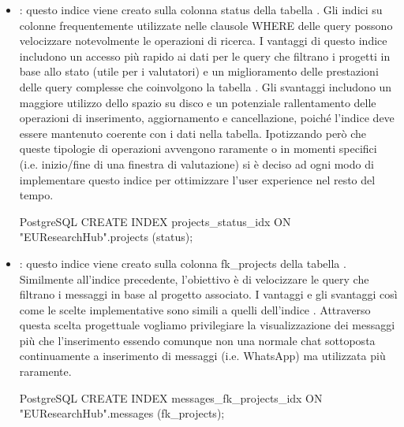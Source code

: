 \documentclass{report}
\begin{document}
\begin{itemize}
\item {}: questo indice viene creato sulla colonna status della tabella . Gli indici su colonne frequentemente utilizzate nelle clausole WHERE delle query possono velocizzare notevolmente le operazioni di ricerca. I vantaggi di questo indice includono un accesso più rapido ai dati per le query che filtrano i progetti in base allo stato (utile per i valutatori) e un miglioramento delle prestazioni delle query complesse che coinvolgono la tabella . Gli svantaggi includono un maggiore utilizzo dello spazio su disco e un potenziale rallentamento delle operazioni di inserimento, aggiornamento e cancellazione, poiché l'indice deve essere mantenuto coerente con i dati nella tabella. Ipotizzando però che queste tipologie di operazioni avvengono raramente o in momenti specifici (i.e. inizio/fine di una finestra di valutazione) si è deciso ad ogni modo di implementare questo indice per ottimizzare l'user experience nel resto del tempo.\\

\begin{minipage}{\linewidth}
\begin{imtaCode}{PostgreSQL}
CREATE INDEX projects_status_idx ON "EUResearchHub".projects (status);
\end{imtaCode}
\end{minipage}


\item {}: questo indice viene creato sulla colonna fk\_projects della tabella . Similmente all'indice precedente, l'obiettivo è di velocizzare le query che filtrano i messaggi in base al progetto associato. I vantaggi e gli svantaggi così come le scelte implementative sono simili a quelli dell'indice . Attraverso questa scelta progettuale vogliamo privilegiare la visualizzazione dei messaggi più che l'inserimento essendo comunque non una normale chat sottoposta continuamente a inserimento di messaggi (i.e. WhatsApp) ma utilizzata più raramente. \\

\begin{minipage}{\linewidth}
\begin{imtaCode}{PostgreSQL}
CREATE INDEX messages_fk_projects_idx ON "EUResearchHub".messages (fk_projects);
\end{imtaCode}
\end{minipage}



\end{itemize}
\end{document}
